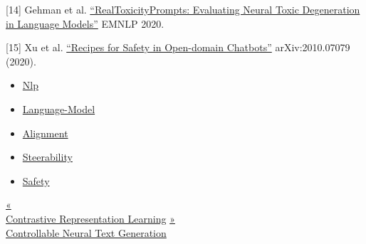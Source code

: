 {[}14{]} Gehman et al. \href{https://arxiv.org/abs/2009.11462}{``RealToxicityPrompts: Evaluating Neural Toxic Degeneration in Language Models''} EMNLP 2020.

{[}15{]} Xu et al. \href{https://arxiv.org/abs/2010.07079}{``Recipes for Safety in Open-domain Chatbots''} arXiv:2010.07079 (2020).

\begin{itemize}
\tightlist
\item
  \href{https://lilianweng.github.io/tags/nlp/}{Nlp}
\item
  \href{https://lilianweng.github.io/tags/language-model/}{Language-Model}
\item
  \href{https://lilianweng.github.io/tags/alignment/}{Alignment}
\item
  \href{https://lilianweng.github.io/tags/steerability/}{Steerability}
\item
  \href{https://lilianweng.github.io/tags/safety/}{Safety}
\end{itemize}

\href{https://lilianweng.github.io/posts/2021-05-31-contrastive/}{{« }\\
{Contrastive Representation Learning}} \href{https://lilianweng.github.io/posts/2021-01-02-controllable-text-generation/}{{ »}\\
{Controllable Neural Text Generation}}

